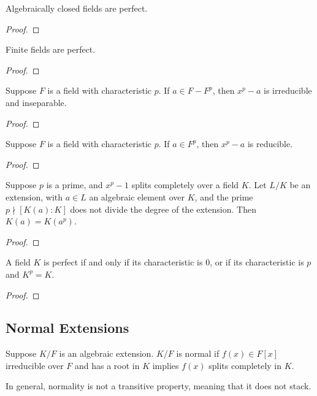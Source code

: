\begin{proposition}
    Algebraically closed fields are perfect.
\end{proposition}
\begin{proof}
\end{proof}
\begin{theorem}
    Finite fields are perfect.
\end{theorem}
\begin{proof}
\end{proof}

\begin{lemma}
    Suppose \(F\) is a field with characteristic \(p\).
    If \(a \in F - F^p\), then \(x^p - a\) is irreducible and inseparable.
\end{lemma}
\begin{proof}
\end{proof}
\begin{lemma}
    Suppose \(F\) is a field with characteristic \(p\).
    If \(a \in F^p\), then \(x^p - a\) is reducible.
\end{lemma}
\begin{proof}
\end{proof}
\begin{proposition}
    Suppose \(p\) is a prime,
    and \(x^p - 1\) splits completely over a field \(K\).
    Let \(L/K\) be an extension, with \(a \in L\) an algebraic element over \(K\),
    and the prime \(p \nmid [K(a):K]\) does not divide the degree of the extension.
    Then \(K(a) = K(a^p)\).
\end{proposition}
\begin{proof}
\end{proof}
\begin{theorem}
    A field \(K\) is perfect
    if and only if its characteristic is 0,
    or if its characteristic is \(p\) and \(K^p = K\).
\end{theorem}
\begin{proof}
\end{proof}

\subsection*{Normal Extensions}

\begin{definition}
    Suppose \(K/F\) is an algebraic extension.
    \(K/F\) is normal if \(f(x) \in F[x]\) irreducible over \(F\)
    and has a root in \(K\) implies \(f(x)\) splits completely in \(K\).
\end{definition}
\begin{remark}
    In general, normality is not a transitive property,
    meaning that it does not stack.
\end{remark}

